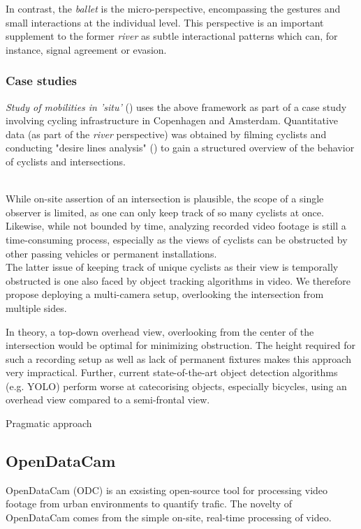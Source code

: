 In contrast, the \textit{ballet} is the micro-perspective, encompassing the gestures and small interactions at the individual level.
This perspective is an important supplement to the former \textit{river} as subtle interactional patterns which can, for instance,
 signal agreement or evasion.

\subsubsection{Case studies}
\textit{Study of mobilities in 'situ'} (\cite{situ}) uses the above framework as part of a case study involving cycling infrastructure in 
Copenhagen and Amsterdam. Quantitative data (as part of the \textit{river} perspective) was obtained by filming cyclists and conducting 
"desire lines analysis" (\cite{cva}) to gain a structured overview of the behavior of cyclists and intersections. 


\ \\

 While on-site assertion of an intersection is plausible, the scope of a single observer is limited, as one can only keep track of 
 so many cyclists at once. Likewise, while not bounded by time, analyzing recorded video footage is still a time-consuming process, 
 especially as the views of cyclists can be obstructed by other passing vehicles or permanent installations.
\ \\

The latter issue of keeping track of unique cyclists as their view is temporally obstructed is one also faced by 
object tracking algorithms in video. We therefore propose deploying a multi-camera setup, overlooking the intersection from
multiple sides.

In theory, a top-down overhead view, overlooking from the center of the intersection would be optimal for minimizing obstruction.
The height required for such a recording setup as well as lack of permanent fixtures makes this approach very impractical. 
Further, current state-of-the-art object detection algorithms (e.g. YOLO) perform worse at catecorising objects, especially bicycles, 
using an overhead view compared to a semi-frontal view.

Pragmatic approach


\subsection{OpenDataCam}
OpenDataCam (ODC) is an exsisting open-source tool for processing video footage from urban environments to quantify
trafic. The novelty of OpenDataCam comes from the simple on-site, real-time processing of video. 
\ \\

